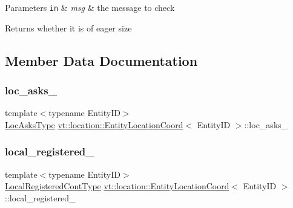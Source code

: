 \begin{DoxyParams}[1]{Parameters}
\mbox{\tt in}  & {\em msg} & the message to check\\
\hline
\end{DoxyParams}
\begin{DoxyReturn}{Returns}
whether it is of eager size 
\end{DoxyReturn}


\subsection{Member Data Documentation}
\mbox{\label{structvt_1_1location_1_1_entity_location_coord_a52abbeb79fc2d24889a05ac87ad6e7f5}} 
\subsubsection{\texorpdfstring{loc\+\_\+asks\+\_\+}{loc\_asks\_}}
{\footnotesize\ttfamily template$<$typename Entity\+ID$>$ \\
\hyperlink{structvt_1_1location_1_1_entity_location_coord_a492ca5404229c05923f69bae396f2ac4}{Loc\+Asks\+Type} \hyperlink{structvt_1_1location_1_1_entity_location_coord}{vt\+::location\+::\+Entity\+Location\+Coord}$<$ Entity\+ID $>$\+::loc\+\_\+asks\+\_\+\hspace{0.3cm}{\ttfamily [private]}}

\mbox{\label{structvt_1_1location_1_1_entity_location_coord_a17f116f6581c4f67c2c5450db40f70a6}} 
\subsubsection{\texorpdfstring{local\+\_\+registered\+\_\+}{local\_registered\_}}
{\footnotesize\ttfamily template$<$typename Entity\+ID$>$ \\
\hyperlink{structvt_1_1location_1_1_entity_location_coord_a90aee70e2e80fe4c1abf1d0616113708}{Local\+Registered\+Cont\+Type} \hyperlink{structvt_1_1location_1_1_entity_location_coord}{vt\+::location\+::\+Entity\+Location\+Coord}$<$ Entity\+ID $>$\+::local\+\_\+registered\+\_\+\hspace{0.3cm}{\ttfamily [private]}}

